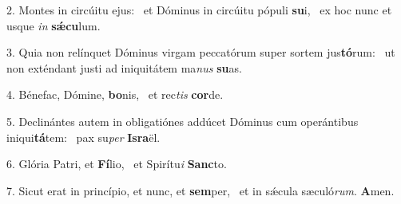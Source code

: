 2. Montes in circúitu ejus: \dag\  et Dóminus in circúitu pópuli \textbf{su}i, \ast\  ex hoc nunc et usque \textit{in} \textbf{sǽ}\textbf{cu}lum.\

3. Quia non relínquet Dóminus virgam peccatórum super sortem jus\textbf{tó}rum: \ast\  ut non exténdant justi ad iniquitátem ma\textit{nus} \textbf{su}as.\

4. Bénefac, Dómine, \textbf{bo}nis, \ast\  et rec\textit{tis} \textbf{cor}de.\

5. Declinántes autem in obligatiónes addúcet Dóminus cum operántibus iniqui\textbf{tá}tem: \ast\  pax su\textit{per} \textbf{Is}\textbf{ra}ël.\

6. Glória Patri, et \textbf{Fí}lio, \ast\  et Spirítu\textit{i} \textbf{Sanc}to.\

7. Sicut erat in princípio, et nunc, et \textbf{sem}per, \ast\  et in sǽcula sæculó\textit{rum}. \textbf{A}men.\

